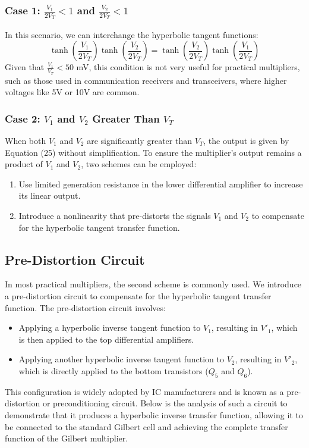\documentclass[a4paper,9pt,twoside,openany,twocolumn]{memoir}
\begin{document}
\subsubsection{Case 1: \( \frac{V_1}{2V_T} < 1 \) and \( \frac{V_2}{2V_T} < 1 \)}
In this scenario, we can interchange the hyperbolic tangent functions:
\[
\tanh\left(\frac{V_1}{2V_T}\right) \tanh\left(\frac{V_2}{2V_T}\right) = \tanh\left(\frac{V_2}{2V_T}\right) \tanh\left(\frac{V_1}{2V_T}\right)
\]
Given that \( \frac{V_1}{V_T} < 50 \) mV, this condition is not very useful for practical multipliers, such as those used in communication receivers and transceivers, where higher voltages like 5V or 10V are common.

\subsubsection{Case 2: \( V_1 \) and \( V_2 \) Greater Than \( V_T \)}
When both \( V_1 \) and \( V_2 \) are significantly greater than \( V_T \), the output is given by Equation (25) without simplification. To ensure the multiplier's output remains a product of \( V_1 \) and \( V_2 \), two schemes can be employed:
\begin{enumerate}
    \item Use limited generation resistance in the lower differential amplifier to increase its linear output.
    \item Introduce a nonlinearity that pre-distorts the signals \( V_1 \) and \( V_2 \) to compensate for the hyperbolic tangent transfer function.
\end{enumerate}

\subsection{Pre-Distortion Circuit}
In most practical multipliers, the second scheme is commonly used. We introduce a pre-distortion circuit to compensate for the hyperbolic tangent transfer function. The pre-distortion circuit involves:
\begin{itemize}
    \item Applying a hyperbolic inverse tangent function to \( V_1 \), resulting in \( V'_1 \), which is then applied to the top differential amplifiers.
    \item Applying another hyperbolic inverse tangent function to \( V_2 \), resulting in \( V'_2 \), which is directly applied to the bottom transistors (\( Q_5 \) and \( Q_6 \)).
\end{itemize}
This configuration is widely adopted by IC manufacturers and is known as a pre-distortion or preconditioning circuit. Below is the analysis of such a circuit to demonstrate that it produces a hyperbolic inverse transfer function, allowing it to be connected to the standard Gilbert cell and achieving the complete transfer function of the Gilbert multiplier.
\end{document}
